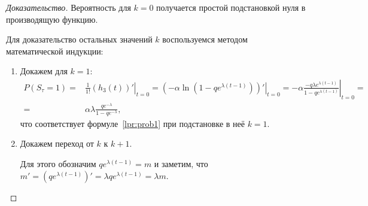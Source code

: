 \documentclass[12pt, specialist, subf, substylefile = spbu_report.rtx]{disser}
\begin{document}
	\begin{proof}[Доказательство]
		Вероятность для $k = 0$ получается простой подстановкой нуля в производящую функцию.
		
		Для доказательство остальных значений $k$ воспользуемся методом математической индукции:
		
		\begin{enumerate}
			\item Докажем для $k = 1$:
			\[
				\begin{aligned}
					P (S _\tau = 1) =& \left.\frac 1 {1 !} \left(h _3(t)\right)'\right| _{t = 0} = \left.\left(-\alpha \ln \left(1 - q e ^{\lambda (t - 1)}\right)\right)'\right| _{t = 0} = \left.-\alpha \frac {-q \lambda e ^{\lambda (t - 1)}} {1 - q e ^{\lambda (t - 1)}} \right| _{t = 0} =\\
					=& \alpha \lambda \frac {q e ^{-\lambda}} {1 - q e ^{-\lambda}},
				\end{aligned}
			\]
			что соответствует формуле~\ref{lpr:prob1} при подстановке в неё $k = 1$.
			
			\item Докажем переход от $k$ к $k + 1$.
			
			Для этого обозначим $q e ^{\lambda (t - 1)} = m$ и заметим, что $m' = \left(q e ^{\lambda(t - 1)}\right)' = \lambda q e ^{\lambda(t - 1)} = \lambda m $.
			

\end{enumerate}
\end{proof}
\end{document}
